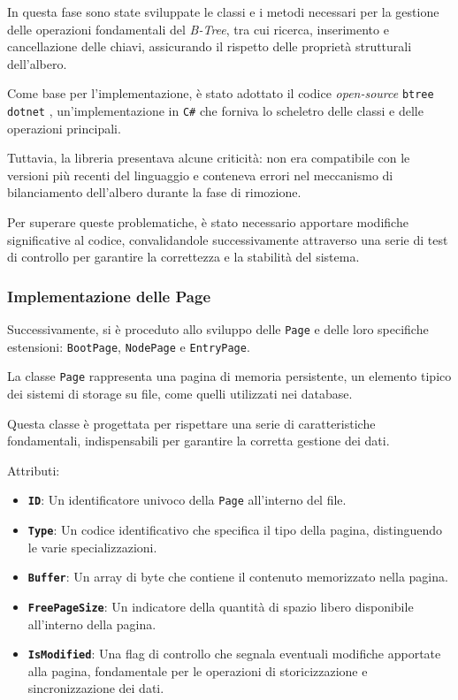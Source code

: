 \documentclass[12pt,a4paper,openright,twoside]{book}
\begin{document}
                In questa fase sono state sviluppate le classi e i metodi necessari per la gestione delle operazioni fondamentali del \textit{B-Tree}, tra cui ricerca, inserimento e cancellazione delle chiavi, assicurando il rispetto delle proprietà strutturali dell’albero.

                Come base per l’implementazione, è stato adottato il codice \textit{open-source} \texttt{btree dotnet} \cite{rsdcastro_btree_dotnet}, un’implementazione in \texttt{C\#} che forniva lo scheletro delle classi e delle operazioni principali.

                Tuttavia, la libreria presentava alcune criticità: non era compatibile con le versioni più recenti del linguaggio e conteneva errori nel meccanismo di bilanciamento dell’albero durante la fase di rimozione.

                Per superare queste problematiche, è stato necessario apportare modifiche significative al codice, convalidandole successivamente attraverso una serie di test di controllo per garantire la correttezza e la stabilità del sistema.

            \subsubsection{Implementazione delle Page}

                Successivamente, si è proceduto allo sviluppo delle \texttt{Page} e delle loro specifiche estensioni: \texttt{BootPage}, \texttt{NodePage} e \texttt{EntryPage}.

                

                La classe \texttt{Page} rappresenta una pagina di memoria persistente, un elemento tipico dei sistemi di storage su file, come quelli utilizzati nei database.

                Questa classe è progettata per rispettare una serie di caratteristiche fondamentali, indispensabili per garantire la corretta gestione dei dati.

                Attributi:
                \begin{itemize}
                    \item \textbf{\texttt{ID}}: Un identificatore univoco della \texttt{Page} all'interno del file.
                    \item \textbf{\texttt{Type}}: Un codice identificativo che specifica il tipo della pagina, distinguendo le varie specializzazioni.
                    \item \textbf{\texttt{Buffer}}: Un array di byte che contiene il contenuto memorizzato nella pagina.
                    \item \textbf{\texttt{FreePageSize}}: Un indicatore della quantità di spazio libero disponibile all'interno della pagina.
                    \item \textbf{\texttt{IsModified}}: Una flag di controllo che segnala eventuali modifiche apportate alla pagina, fondamentale per le operazioni di storicizzazione e sincronizzazione dei dati.
                \end{itemize}
\end{document}
